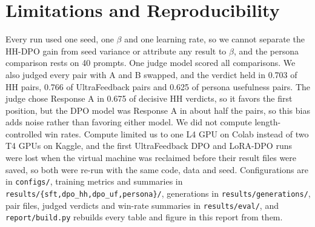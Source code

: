 \documentclass{article}
\begin{document}
\begin{table}[t]
  \centering
  \caption{HH-DPO vs.\ SFT by category on the helpful and harmless set (30 prompts each), sorted by win rate (ties as half), with mean new tokens of each model.}
  \label{tab:hh-cat}
  \small
\end{table}



\section{Limitations and Reproducibility}
\label{sec:limits}

Every run used one seed, one $\beta$ and one learning rate, so we cannot separate the HH-DPO gain from seed variance or attribute any result to $\beta$, and the persona comparison rests on 40 prompts. One judge model scored all comparisons. We also judged every pair with A and B swapped, and the verdict held in 0.703 of HH pairs, 0.766 of UltraFeedback pairs and 0.625 of persona usefulness pairs. The judge chose Response A in 0.675 of decisive HH verdicts, so it favors the first position, but the DPO model was Response A in about half the pairs, so this bias adds noise rather than favoring either model. We did not compute length-controlled win rates. Compute limited us to one L4 GPU on Colab instead of two T4 GPUs on Kaggle, and the first UltraFeedback DPO and LoRA-DPO runs were lost when the virtual machine was reclaimed before their result files were saved, so both were re-run with the same code, data and seed. Configurations are in \texttt{configs/}, training metrics and summaries in \texttt{results/\{sft,dpo\_hh,dpo\_uf,persona\}/}, generations in \texttt{results/generations/}, pair files, judged verdicts and win-rate summaries in \texttt{results/eval/}, and \texttt{report/build.py} rebuilds every table and figure in this report from them.

\begin{table}[!h]
  \begin{minipage}[t]{0.47\linewidth}
    \centering
    \caption{LoRA-DPO vs.\ SmolLM2 by persona category (10 prompts each), on the style rubric and the usefulness and safety rubric. W / T / L are wins, ties and losses for LoRA-DPO.}
    \label{tab:persona-cat}
    \footnotesize\setlength{\tabcolsep}{2pt}
  \end{minipage}\hfill
  \begin{minipage}[t]{0.5\linewidth}
    \centering
    \caption{Length signals on the 1,000 validation pairs at the selected checkpoint. Reward accuracy on pairs whose chosen response is longer or shorter than the rejected one ($n$ pairs, equal lengths excluded), and the correlation between length gap and margin.}
    \label{tab:length}
    \footnotesize\setlength{\tabcolsep}{2pt}
  \end{minipage}
\end{table}

\FloatBarrier


\end{document}

